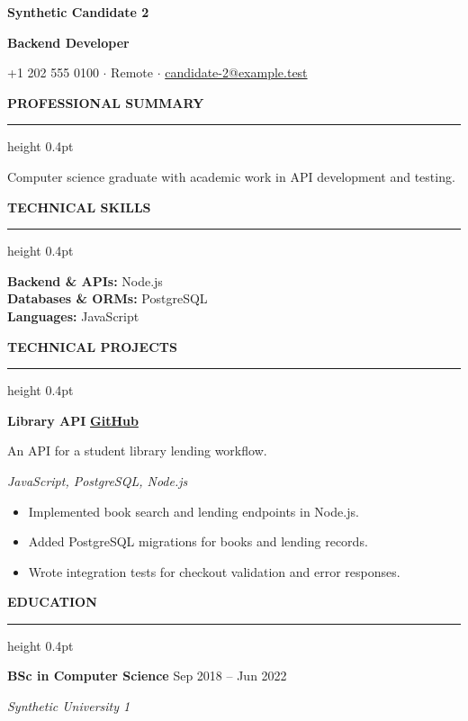 \documentclass[10pt,letterpaper]{article}
\newcommand{\atsHeaderToSection}{13pt}
\newcommand{\atsSectionToSection}{15pt}
\newcommand{\atsHeadingToContent}{5pt}
\newcommand{\atsProjectTitleToTech}{2.3pt}
\newcommand{\atsProjectTechToBullets}{3.7pt}
\newcommand{\atsRoleToMetadata}{1.5pt}
\newcommand{\atsBulletToBullet}{2.2pt}
\newcommand{\atssection}[1]{%
  \vspace{\atsSectionToSection}%
  {\noindent\large\bfseries\uppercase{#1}}\par
  \vspace{1.5pt}\hrule height 0.4pt\vspace{\atsHeadingToContent}%
}
\newcommand{\atsfirstsection}[1]{%
  \vspace{\atsHeaderToSection}%
  {\noindent\large\bfseries\uppercase{#1}}\par
  \vspace{1.5pt}\hrule height 0.4pt\vspace{\atsHeadingToContent}%
}
\begin{document}
{\centering
  {\Huge \textbf{Synthetic Candidate 2}}\par
  \vspace{3pt}
  {\large \textbf{Backend Developer}}\par
  \vspace{3pt}
  {\small +1 202 555 0100 $\cdot$ Remote $\cdot$ \href{mailto:candidate-2@example.test}{candidate-2@example.test}}\par
}

\atsfirstsection{Professional Summary}
Computer science graduate with academic work in API development and testing.\par

\atssection{Technical Skills}
\textbf{Backend \& APIs:} Node.js\\
\textbf{Databases \& ORMs:} PostgreSQL\\
\textbf{Languages:} JavaScript\par

\atssection{Technical Projects}
\textbf{Library API} \hfill {\small \href{https://github.com/synthetic-fixture/project-1}{\textbf{GitHub}}}\par
An API for a student library lending workflow.\par
\vspace{\atsProjectTitleToTech}
{\textit{JavaScript, PostgreSQL, Node.js}}\par
\vspace{\atsProjectTechToBullets}
\begin{itemize}
\setlength{\itemsep}{\atsBulletToBullet}\setlength{\parskip}{0pt}\setlength{\parsep}{0pt}\setlength{\topsep}{0pt}\setlength{\partopsep}{0pt}
  \item Implemented book search and lending endpoints in Node.js.
  \item Added PostgreSQL migrations for books and lending records.
  \item Wrote integration tests for checkout validation and error responses.
\end{itemize}

\atssection{Education}
\textbf{BSc in Computer Science} \hfill Sep 2018 -- Jun 2022\par
\vspace{\atsRoleToMetadata}
{\small\textit{Synthetic University 1}}\par
\end{document}
